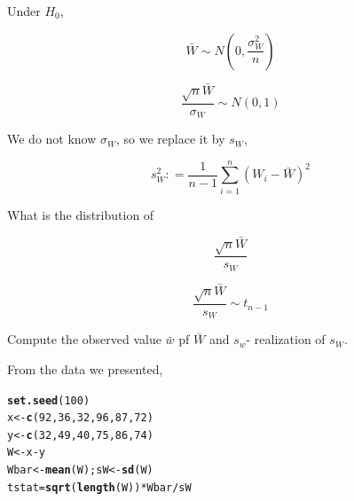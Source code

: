 \documentclass{beamer}\usepackage[]{graphicx}\usepackage[]{color}
\makeatletter
\newcommand{\hlnum}[1]{\textcolor[rgb]{0.2,0.2,0.2}{#1}}%
\newcommand{\hlopt}[1]{\textcolor[rgb]{0.102,0.102,0.102}{#1}}%
\newcommand{\hlstd}[1]{\textcolor[rgb]{0.102,0.102,0.102}{#1}}%
\newcommand{\hlkwb}[1]{\textcolor[rgb]{0.102,0.102,0.102}{#1}}%
\newcommand{\hlkwd}[1]{\textcolor[rgb]{0.102,0.102,0.102}{\textbf{#1}}}%
\newenvironment{kframe}{%
 \def\at@end@of@kframe{}%
 \ifinner\ifhmode%
  \def\at@end@of@kframe{\end{minipage}}%
  \begin{minipage}{\columnwidth}%
 \fi\fi%
 \def\FrameCommand##1{\hskip\@totalleftmargin \hskip-\fboxsep
 \colorbox{shadecolor}{##1}\hskip-\fboxsep
     \hskip-\linewidth \hskip-\@totalleftmargin \hskip\columnwidth}%
 \MakeFramed {\advance\hsize-\width
   \@totalleftmargin\z@ \linewidth\hsize
   \@setminipage}}%
 {\par\unskip\endMakeFramed%
 \at@end@of@kframe}
\newenvironment{knitrout}{}{} %
\renewenvironment{knitrout}{\begin{spacing}{0.75}\begin{tiny}}{\end{tiny}\end{spacing}}
\makeatother
\begin{document}
\begin{frame}

Under $H_{0}$,

$$ \bar{W} \sim N \left( 0, \frac{\sigma^2_{W}}{n} \right) $$

$$ \frac{\sqrt{n} \bar{W}}{\sigma_{W}} \sim N(0,1) $$

We do not know $\sigma_{W}$, so we replace it by $s_{W}$, 

$$ s^2_{W} : = \frac{1}{n-1} \sum_{i=1}^{n} \left (W_i - \bar{W} \right )^2 $$

What is the distribution of 

$$ \frac{\sqrt{n} \bar{W}}{s_{W}}  $$

\end{frame}

\begin{frame}[fragile]

$$ \frac{\sqrt{n} \bar{W}}{s_{W}}  \sim t_{n-1}  $$

Compute the observed value $\bar{w}$ pf $\bar{W}$ and $s_{w}$- realization of $s_{W}$.

From the data we presented,

\begin{knitrout}\small
{}\color{fgcolor}\begin{kframe}
\begin{alltt}
\hlkwd{set.seed}\hlstd{(}\hlnum{100}\hlstd{)}
\hlstd{x} \hlkwb{<-} \hlkwd{c}\hlstd{(}\hlnum{92}\hlstd{,} \hlnum{36}\hlstd{,} \hlnum{32}\hlstd{,} \hlnum{96}\hlstd{,} \hlnum{87}\hlstd{,} \hlnum{72}\hlstd{)}
\hlstd{y} \hlkwb{<-} \hlkwd{c}\hlstd{(}\hlnum{32}\hlstd{,} \hlnum{49}\hlstd{,} \hlnum{40}\hlstd{,} \hlnum{75}\hlstd{,} \hlnum{86}\hlstd{,} \hlnum{74}\hlstd{)}
\hlstd{W} \hlkwb{<-} \hlstd{x}\hlopt{-}\hlstd{y}
\hlstd{Wbar} \hlkwb{<-} \hlkwd{mean}\hlstd{(W); sW} \hlkwb{<-} \hlkwd{sd}\hlstd{(W)}
\hlstd{tstat} \hlkwb{=} \hlkwd{sqrt}\hlstd{(}\hlkwd{length}\hlstd{(W))}\hlopt{*}\hlstd{Wbar}\hlopt{/}\hlstd{sW}
\end{alltt}
\end{kframe}
\end{knitrout}


\end{frame}
\end{document}
